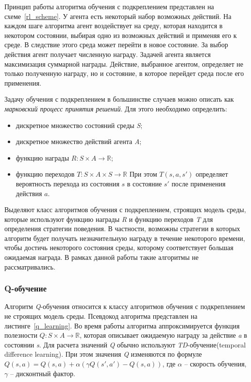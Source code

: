 Принцип работы алгоритма обучения с подкреплением представлен на схеме~\ref{rl_scheme}. У агента есть некоторый набор возможных действий. На каждом шаге алгоритма агент воздействует на среду, которая находится в некотором состоянии, выбирая одно из возможных действий и применяя его к среде. В следствие этого среда может перейти в новое состояние. За выбор действия агент получает численную награду. Задачей агента является максимизация суммарной награды. Действие, выбранное агентом, определяет не только полученную награду, но и состояние, в которое перейдет среда после его применения.

Задачу обучения с подкреплением в большинстве случаев можно описать как \textit{марковский процесс принятия решений}. Для этого необходимо определить:

\begin{itemize}
    \item дискретное множество состояний среды \textit{S};
    \item дискретное множество действий агента \textit{A};
    \item функцию награды $R : S \times A \rightarrow \mathbb{R}$;
    \item функцию переходов $T : S \times A \times S \rightarrow \mathbb{R}$ При этом $T(s, a, s')$ определяет вероятность перехода из состояния $s$ в состояние $s'$ после применения действия $a$.
\end{itemize}

Выделяют класс алгоритмов обучения с подкреплением, строящих модель среды, которые используют функцию награды \textit{R} и функцию переходов \textit{T} для определения стратегии поведения. В частности, возможны стратегии в которых алгоритм будет получать незначительную награду в течение некоторого времени, чтобы достичь некоторого состояния среды, которому соответствует большая ожидаемая награда. В рамках данной работы такие алгоритмы не рассматривались.

\subsubsection{Q-обучение}

Алгоритм \textit{Q}-обучения относится к классу алгоритмов обучения с подкреплением не строящих модель среды. Псевдокод алгоритма представлен на листинге~\ref{q_learning}. Во время работы алгоритма аппроксимируется функция полезности $Q : S \times A \rightarrow \mathbb{R}$, которая описывает ожидаемую награду за действие \textit{a} в состоянии \textit{s}. Для расчета значений \textit{Q} обычно используют \textit{TD}-обучение(temporal difference learning). При этом значения \textit{Q} изменяются по формуле $Q(s, a) = Q(s, a) + \alpha (\gamma Q(s', a') - Q(s, a))$, где $\alpha$ -- скорость обучения, $\gamma$ -- дисконтный фактор.


